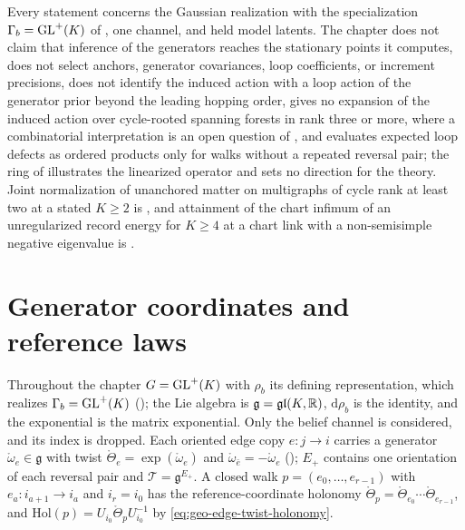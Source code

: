 Every statement concerns the Gaussian realization with the specialization
\(\Gamma_b=\mathrm{GL}^+(K)\) of , one channel, and held model latents. The
chapter does not claim that inference of the generators reaches the stationary points it computes,
does not select anchors, generator covariances, loop coefficients, or increment precisions, does
not identify the induced action with a loop action of the generator prior beyond the leading
hopping order, gives no expansion of the induced action over cycle-rooted spanning forests in rank
three or more, where a combinatorial interpretation is an open question of
\citet[Sec.~14]{Kenyon2011VectorBundleLaplacian}, and evaluates expected loop defects as ordered
products only for walks without a repeated reversal pair; the ring of  illustrates
the linearized operator and sets no direction for the theory.  Joint
normalization of unanchored matter on multigraphs of cycle rank at least two at a stated
\(K\geq2\) is , and attainment of the chart infimum of an
unregularized record energy for \(K\geq4\) at a chart link with a non-semisimple negative eigenvalue
is .

\section{Generator coordinates and reference laws}
\label{sec:glink-setting}

Throughout the chapter \(G=\mathrm{GL}^+(K)\) with \(\rho_b\) its defining representation, which realizes
\(\Gamma_b=\mathrm{GL}^+(K)\) (); the Lie algebra is
\(\mathfrak g=\mathfrak{gl}(K,\mathbb R)\), \(\mathrm d\rho_b\) is the identity, and the exponential is
the matrix exponential. Only the belief channel is considered, and its index is dropped. Each
oriented edge copy \(e:j\to i\) carries a generator \(\mathring\omega_e\in\mathfrak g\) with twist
\(\mathring\Theta_e=\exp(\mathring\omega_e)\) and \(\mathring\omega_{\bar e}=-\mathring\omega_e\)
(); \(E_+\) contains one orientation of each reversal pair and
\(\mathscr T=\mathfrak g^{E_+}\). A closed walk \(p=(e_0,\ldots,e_{r-1})\) with
\(e_a:i_{a+1}\to i_a\) and \(i_r=i_0\) has the reference-coordinate holonomy
\(\mathring\Theta_p=\mathring\Theta_{e_0}\cdots\mathring\Theta_{e_{r-1}}\), and
\(\mathrm{Hol}(p)=U_{i_0}\mathring\Theta_pU_{i_0}^{-1}\) by \eqref{eq:geo-edge-twist-holonomy}.

